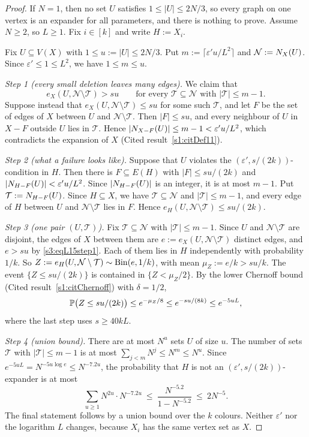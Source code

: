 \begin{proof}
If $N=1$, then no set $U$ satisfies $1\le|U|\le 2N/3$, so every graph on
one vertex is an expander for all parameters, and there is nothing to
prove. Assume $N\ge2$, so $L\ge1$. Fix $i\in[k]$ and write
$H:=X_i$.

Fix $U\subseteq V(X)$ with $1\le u:=|U|\le 2N/3$. Put
$m:=\lceil\varepsilon' u/L^2\rceil$ and
$\mathcal N:=N_X(U)$. Since $\varepsilon'\le1\le L^2$, we have
$1\le m\le u$.

\smallskip\noindent\emph{Step 1 (every small deletion leaves many edges).}
We claim that
\begin{equation}\label{s3:eqL15step1}
e_X(U,\mathcal N\setminus\mathcal T)>su\qquad\text{for every }\mathcal T\subseteq\mathcal N\text{ with }|\mathcal T|\le m-1 .
\end{equation}
Suppose instead that $e_X(U,\mathcal N\setminus\mathcal T)\le su$ for some
such $\mathcal T$, and let $F$ be the set of edges of $X$ between $U$ and
$\mathcal N\setminus\mathcal T$. Then $|F|\le su$, and every neighbour of
$U$ in $X-F$ outside $U$ lies in $\mathcal T$. Hence
$|N_{X-F}(U)|\le m-1<\varepsilon' u/L^2$, which contradicts the
expansion of $X$ (Cited result~\ref{s1:citDef11}).

\smallskip\noindent\emph{Step 2 (what a failure looks like).} Suppose
that $U$ violates the $(\varepsilon',s/(2k))$-condition in $H$. Then
there is $F\subseteq E(H)$ with $|F|\le su/(2k)$ and
$|N_{H-F}(U)|<\varepsilon'u/L^2$. Since $|N_{H-F}(U)|$ is an
integer, it is at most $m-1$. Put $\mathcal T:=N_{H-F}(U)$. Since
$H\subseteq X$, we have $\mathcal T\subseteq\mathcal N$ and
$|\mathcal T|\le m-1$, and every edge of $H$ between $U$ and
$\mathcal N\setminus\mathcal T$ lies in $F$. Hence
$e_H(U,\mathcal N\setminus\mathcal T)\le su/(2k)$.

\smallskip\noindent\emph{Step 3 (one pair $(U,\mathcal T)$).} Fix
$\mathcal T\subseteq\mathcal N$ with $|\mathcal T|\le m-1$. Since $U$ and
$\mathcal N\setminus\mathcal T$ are disjoint, the edges of $X$ between
them are $e:=e_X(U,\mathcal N\setminus\mathcal T)$ distinct edges, and
$e>su$ by \eqref{s3:eqL15step1}. Each of them lies in $H$ independently
with probability $1/k$. So
$Z:=e_H(U,\mathcal N\setminus\mathcal T)\sim\mathrm{Bin}(e,1/k)$, with mean
$\mu_Z:=e/k>su/k$. The event $\{Z\le su/(2k)\}$ is contained in
$\{Z<\mu_Z/2\}$. By the lower Chernoff bound (Cited result~\ref{s1:citChernoff})
with $\delta=1/2$,
\[
\mathbb{P}\big(Z\le su/(2k)\big)\le e^{-\mu_Z/8}\le e^{-su/(8k)}\le e^{-5uL},
\]
where the last step uses $s\ge 40kL$.

\smallskip\noindent\emph{Step 4 (union bound).} There are at most $N^u$
sets $U$ of size $u$. The number of sets $\mathcal T$ with
$|\mathcal T|\le m-1$ is at most $\sum_{j<m}N^j\le N^m\le N^u$. Since
$e^{-5uL}=N^{-5u\log e}\le N^{-7.2u}$, the probability that $H$ is not an
$(\varepsilon',s/(2k))$-expander is at most
\[
\sum_{u\ge1}N^{2u}\cdot N^{-7.2u}\ \le\ \frac{N^{-5.2}}{1-N^{-5.2}}\ \le\ 2N^{-5}.
\]
The final statement follows by a union bound over the $k$ colours.
Neither $\varepsilon'$ nor the logarithm $L$ changes, because $X_i$ has
the same vertex set as $X$.
\end{proof}

